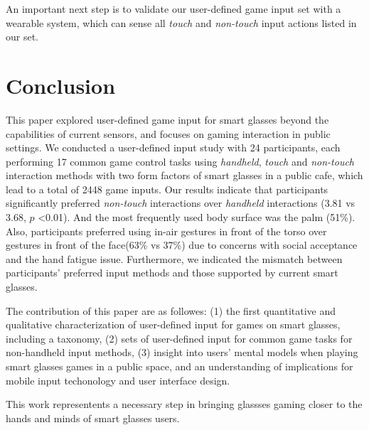 \documentclass{sigchi}
\begin{document}
  An important next step is to validate our user-defined game input set with a wearable system, which can sense all \emph{touch} and \emph{non-touch} input actions listed in our set.   


\section{Conclusion}

This paper explored user-defined game input for smart glasses beyond the capabilities of current sensors, and focuses on gaming interaction in public settings. We conducted a user-defined input study with 24 participants, each performing 17 common game control tasks using \emph{handheld}, \emph{touch} and \emph{non-touch} interaction methods with two form factors of smart glasses in a public cafe, which lead to a total of 2448 game inputs. Our results indicate that participants significantly preferred \emph{non-touch} interactions over \emph{handheld} interactions (3.81 vs 3.68, $p$ \textless 0.01). And the most frequently used body surface was the palm (51\%). Also, participants preferred using in-air gestures in front of the torso over gestures in front of the face(63\% vs 37\%) due to concerns with social acceptance and the hand fatigue issue. Furthermore, we indicated the mismatch between participants' preferred input methods and those supported by current smart glasses.

The contribution of this paper are as followes: (1) the first quantitative and qualitative characterization of user-defined input for games on smart glasses, including a taxonomy, (2) sets of user-defined input for common game tasks for non-handheld input methods, (3) insight into users' mental models when playing smart glasses games in a public space, and an understanding of implications for mobile input techonology and user interface design.

This work representents a necessary step in bringing glassses gaming closer to the hands and minds of smart glasses users.


\end{document}
